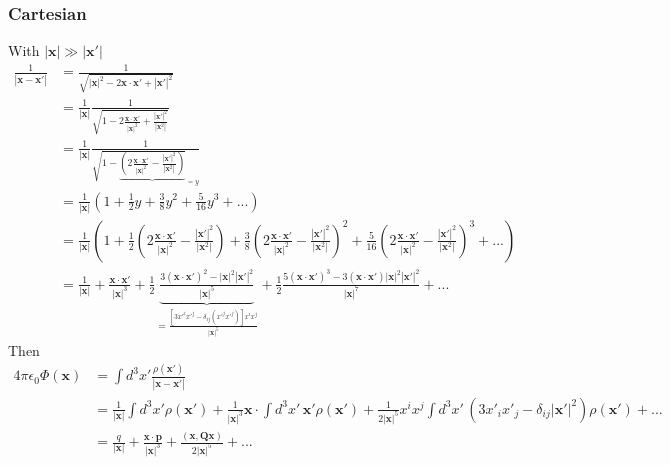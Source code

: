 \documentclass[../main.tex]{subfiles}
\begin{document}
\subsubsection{Cartesian}
With $|\mathbf{x}|\gg|\mathbf{x}'|$
\begin{align}
\frac{1}{|\mathbf{x}-\mathbf{x}'|}
&=\frac{1}{\sqrt{|\mathbf{x}|^2-2\mathbf{x}\cdot\mathbf{x}'+|\mathbf{x}'|^2}}\\
&=\frac{1}{|\mathbf{x}|}\frac{1}{\sqrt{1-2\frac{\mathbf{x}\cdot\mathbf{x}'}{|\mathbf{x}|^2}+\frac{|\mathbf{x}'|^2}{|\mathbf{x}^2|}}}\\
&=\frac{1}{|\mathbf{x}|}\frac{1}{\sqrt{1-\underbrace{\left(2\frac{\mathbf{x}\cdot\mathbf{x}'}{|\mathbf{x}|^2}-\frac{|\mathbf{x}'|^2}{|\mathbf{x}^2|}\right)}}_{=y}}\\
&=\frac{1}{|\mathbf{x}|}\left(1+\frac{1}{2}y+\frac{3}{8}y^2+\frac{5}{16}y^3+... \right)\\
&=\frac{1}{|\mathbf{x}|}\left(1+\frac{1}{2}\left(2\frac{\mathbf{x}\cdot\mathbf{x}'}{|\mathbf{x}|^2}-\frac{|\mathbf{x}'|^2}{|\mathbf{x}^2|}\right)+\frac{3}{8}\left(2\frac{\mathbf{x}\cdot\mathbf{x}'}{|\mathbf{x}|^2}-\frac{|\mathbf{x}'|^2}{|\mathbf{x}^2|}\right)^2+\frac{5}{16}\left(2\frac{\mathbf{x}\cdot\mathbf{x}'}{|\mathbf{x}|^2}-\frac{|\mathbf{x}'|^2}{|\mathbf{x}^2|}\right)^3+... \right)\\
&=\frac{1}{|\mathbf{x}|}
+\frac{\mathbf{x}\cdot\mathbf{x}'}{|\mathbf{x}|^3}
+\frac{1}{2}\underbrace{\frac{3(\mathbf{x}\cdot\mathbf{x}')^2-|\mathbf{x}|^2|\mathbf{x}'|^2}{|\mathbf{x}|^5}}_{=\frac{[3x'^ix'^j-\delta_{ij}(x'^jx'^j)]x^ix^j}{|\mathbf{x}|^5}}
+\frac{1}{2}\frac{5(\mathbf{x}\cdot\mathbf{x}')^3-3(\mathbf{x}\cdot\mathbf{x}')|\mathbf{x}|^2|\mathbf{x}'|^2}{|\mathbf{x}|^7}+...
\end{align}
Then
\begin{align}
4\pi\epsilon_0\Phi(\mathbf{x})
&=\int d^3x'\frac{\rho(\mathbf{x}')}{|\mathbf{x}-\mathbf{x}'|}\\
&=\frac{1}{|\mathbf{x}|}\int d^3x'\rho(\mathbf{x}')
+\frac{1}{|\mathbf{x}|^3}\mathbf{x}\cdot\int d^3x'\,\mathbf{x}'\rho(\mathbf{x}')
+\frac{1}{2|\mathbf{x}|^5}x^ix^j\int d^3x'\,(3x'_ix'_j-\delta_{ij}|\mathbf{x}'|^2)\rho(\mathbf{x}')+...\\
&=\frac{q}{|\mathbf{x}|}+\frac{\mathbf{x}\cdot\mathbf{p}}{|\mathbf{x}|^3}+\frac{(\mathbf{x},\mathbf{Q}\mathbf{x})}{2|\mathbf{x}|^5}+...
\end{align}
\end{document}
